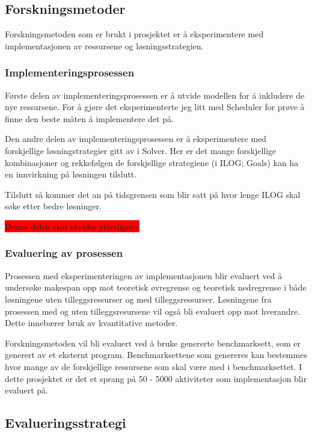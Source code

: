 \subsection{Forskningsmetoder}
Forskningsmetoden som er brukt i prosjektet er å eksperimentere med implementasjonen av ressursene og løsningsstrategien.

\subsubsection{Implementeringsprosessen}
Første delen av implementeringsprosessen er å utvide modellen for å inkludere de nye ressursene. For å gjøre det eksperimenterte jeg litt med Scheduler for prøve å finne den beste måten å implementere det på.

Den andre delen av implementeringsprosessen er å eksperimentere med forskjellige løsningstrategier gitt av i Solver. Her er det mange forskjellige kombinasjoner og rekkefølgen de forskjellige strategiene (i ILOG; Goals) kan ha en innvirkning på løsningen tilslutt.

Tilslutt så kommer det an på tidsgrensen som blir satt på hvor lenge ILOG skal søke etter bedre løsninger.

\colorbox{red}{Denne delen skal utvides ytterligere.}

\subsubsection{Evaluering av prosessen}
Prosessen med eksperimenteringen av implementasjonen blir evaluert ved å undersøke makespan opp mot teoretisk øvregrense og teoretisk nedregrense i både løsningene uten tilleggsressurser og med tilleggsressurser. Løsningene fra prosessen med og uten tilleggsresursene vil også bli evaluert opp mot hverandre. Dette innebærer bruk av kvantitative metoder.

Forskningsmetoden vil bli evaluert ved å bruke genererte benchmarksett, som er generert av et eksternt program. Benchmarksettene som genereres kan bestemmes hvor mange av de forskjellige ressursene som skal være med i benchmarksettet. I dette prosjektet er det et sprang på 50 - 5000 aktiviteter som implementasjon blir evaluert på.

\subsection{Evalueringsstrategi}
